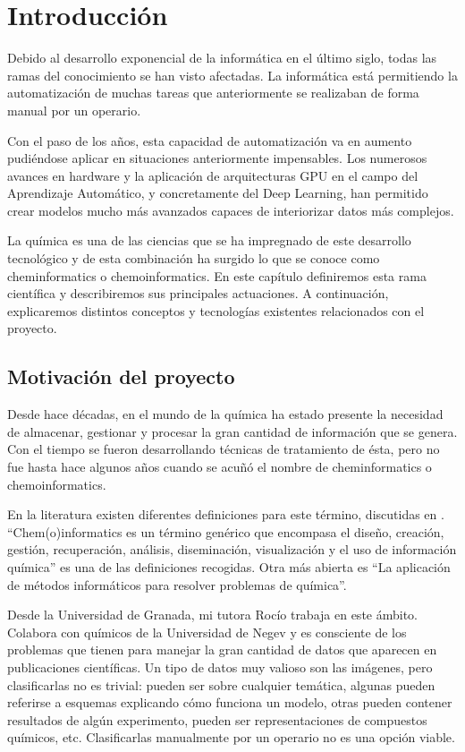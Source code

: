 \chapter*{Introducción}

Debido al desarrollo exponencial de la informática en el último siglo, todas las ramas del conocimiento se han visto afectadas. La informática está permitiendo la automatización de muchas tareas que anteriormente se realizaban de forma manual por un operario. 

Con el paso de los años, esta capacidad de automatización va en aumento pudiéndose aplicar en situaciones anteriormente impensables. Los numerosos avances en hardware y la aplicación de arquitecturas GPU en el campo del Aprendizaje Automático, y concretamente del Deep Learning, han permitido crear modelos mucho más avanzados capaces de interiorizar datos más complejos. 

La química es una de las ciencias que se ha impregnado de este desarrollo tecnológico y de esta combinación ha surgido lo que se conoce como cheminformatics o chemoinformatics. En este capítulo definiremos esta rama científica y describiremos sus principales actuaciones. A continuación, explicaremos distintos conceptos y tecnologías existentes relacionados con el proyecto.

\section*{Motivación del proyecto}
Desde hace décadas, en el mundo de la química ha estado presente la necesidad de almacenar, gestionar y procesar la gran cantidad de información que se genera. Con el tiempo se fueron desarrollando técnicas de tratamiento de ésta, pero no fue hasta hace algunos años cuando se acuñó el nombre de cheminformatics o chemoinformatics. 

En la literatura existen diferentes definiciones para este término, discutidas en \cite{doi:10.1021/ci600234z}. \\
``Chem(o)informatics es un término genérico que encompasa el diseño, creación, gestión, recuperación, análisis, diseminación, visualización y el uso de información química'' es una de las definiciones recogidas. Otra más abierta es ``La aplicación de métodos informáticos para resolver problemas de química''. 

Desde la Universidad de Granada, mi tutora Rocío trabaja en este ámbito. Colabora con químicos de la Universidad de Negev y es consciente de los problemas que tienen para manejar la gran cantidad de datos que aparecen en publicaciones científicas. Un tipo de datos muy valioso son las imágenes, pero clasificarlas no es trivial: pueden ser sobre cualquier temática, algunas pueden referirse a esquemas explicando cómo funciona un modelo, otras pueden contener resultados de algún experimento, pueden ser representaciones de compuestos químicos, etc. Clasificarlas manualmente por un operario no es una opción viable.

